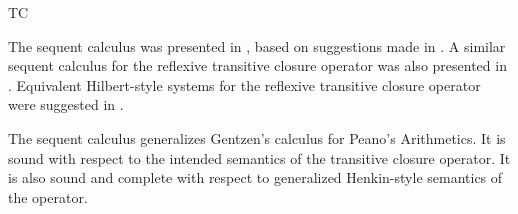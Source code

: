 \begin{entry}{TC}
 \begin{history}
The sequent calculus was presented in \cite{Cohen2014AL}, based on suggestions made in \cite{AvronTC03}. A similar sequent calculus for the reflexive transitive closure operator was also presented in \cite{Cohen2014AL}. Equivalent Hilbert-style systems for the reflexive transitive closure operator were suggested in \cite{martin1943homogeneous, martin1949note, Myhill52}.
 \end{history}

 \begin{technicalities}
The sequent calculus generalizes Gentzen's calculus for Peano's Arithmetics. It is sound with respect to the intended semantics of the transitive closure operator. It is also sound and complete with respect to generalized Henkin-style semantics of the operator. 
\end{technicalities}



%
%
%
%
%
%
% 
%





\end{entry}
